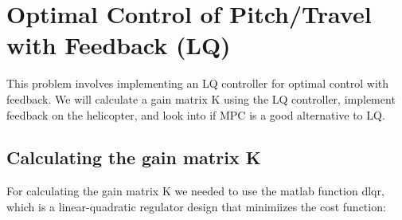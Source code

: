\section{Optimal Control of Pitch/Travel with Feedback (LQ)}\label{sec:prob3}
This problem involves implementing an LQ controller for optimal control with feedback. We will calculate a gain matrix K using the LQ controller, implement feedback on the helicopter, and look into if MPC is a good alternative to LQ.

\subsection{Calculating the gain matrix K}
For calculating the gain matrix K we needed to use the matlab function dlqr, which is a linear-quadratic regulator design that minimiizes the cost function: 
